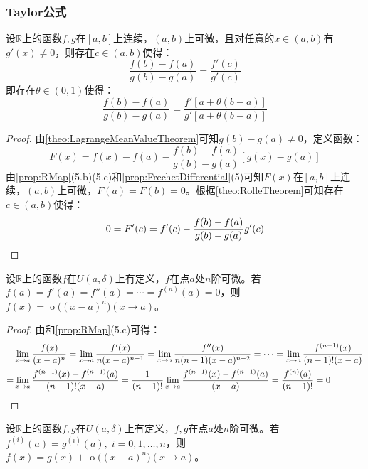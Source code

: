 \subsubsection{Taylor公式}
\begin{theorem}\label{theo:CauchyMeanValueTheorem}
	设$\mathbb{R}$上的函数$f,g$在$[a,b]$上连续，$(a,b)$上可微，且对任意的$x\in(a,b)$有$g'(x)\ne0$，则存在$c\in(a,b)$使得：
	\begin{equation*}
		\frac{f(b)-f(a)}{g(b)-g(a)}=\frac{f'(c)}{g'(c)}
	\end{equation*}
	即存在$\theta\in(0,1)$使得：
	\begin{equation*}
		\frac{f(b)-f(a)}{g(b)-g(a)}=\frac{f'[a+\theta(b-a)]}{g'[a+\theta(b-a)]}
	\end{equation*}
\end{theorem}
\begin{proof}
	由\cref{theo:LagrangeMeanValueTheorem}可知$g(b)-g(a)\ne0$，定义函数：
	\begin{equation*}
		F(x)=f(x)-f(a)-\frac{f(b)-f(a)}{g(b)-g(a)}[g(x)-g(a)]
	\end{equation*}
	由\cref{prop:RMap}(5.b)(5.c)和\cref{prop:FrechetDifferential}(5)可知$F(x)$在$[a,b]$上连续，$(a,b)$上可微，$F(a)=F(b)=0$。根据\cref{theo:RolleTheorem}可知存在$c\in(a,b)$使得：
	\begin{equation*}
		0=F'(c)=f'(c)-\frac{f(b)-f(a)}{g(b)-g(a)}g'(c)\qedhere
	\end{equation*}
\end{proof}
\begin{lemma}\label{lem:Taylor1}
	设$\mathbb{R}$上的函数$f$在$U(a,\delta)$上有定义，$f$在点$a$处$n$阶可微。若$f(a)=f'(a)=f''(a)=\cdots=f^{(n)}(a)=0$，则$f(x)=\operatorname{o}\Big((x-a)^n\Big)(x\to a)$。
\end{lemma}
\begin{proof}
	由和\cref{prop:RMap}(5.c)可得：
	\begin{align*}
		&\lim_{x\to a}\frac{f(x)}{(x-a)^n}=\lim_{x\to a}\frac{f'(x)}{n(x-a)^{n-1}}=\lim_{x\to a}\frac{f''(x)}{n(n-1)(x-a)^{n-2}}=\cdots=\lim_{x\to a}\frac{f^{(n-1)}(x)}{(n-1)!(x-a)} \\
		=&\lim_{x\to a}\frac{f^{(n-1)}(x)-f^{(n-1)}(a)}{(n-1)!(x-a)}=\frac{1}{(n-1)!}\lim_{x\to a}\frac{f^{(n-1)}(x)-f^{(n-1)}(a)}{(x-a)}=\frac{f^{(n)}(a)}{(n-1)!}=0\qedhere
	\end{align*}
\end{proof}
\begin{lemma}\label{lem:Taylor2}
	设$\mathbb{R}$上的函数$f,g$在$U(a,\delta)$上有定义，$f,g$在点$a$处$n$阶可微。若$f^{(i)}(a)=g^{(i)}(a),\;i=0,1,\dots,n$，则$f(x)=g(x)+\operatorname{o}\Big((x-a)^n\Big)(x\to a)$。
\end{lemma}
